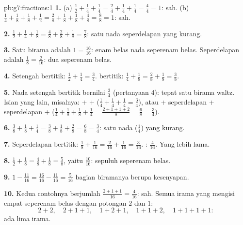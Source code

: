 \begin{solution}{pb:g7:fractions:1}
\textbf{1.} (a) $\frac12 + \frac14 + \frac14 = \frac24 + \frac14
+ \frac14 = \frac44 = 1$: sah. (b) $\frac14 + \frac18 +
\frac18 + \frac12 = \frac28 + \frac18 + \frac18 + \frac48 =
\frac88 = 1$: sah.

\textbf{2.} $\frac12 + \frac14 + \frac18 = \frac48 + \frac28 +
\frac18 = \frac78$: satu nada seperdelapan yang kurang.

\textbf{3.} Satu birama adalah $1 = \frac{16}{16}$: enam belas nada
seperenam belas. Seperdelapan adalah $\frac18 = \frac{2}{16}$: dua seperenam belas.

\textbf{4.} Setengah bertitik: $\frac12 + \frac14 = \frac34$.
 bertitik: $\frac14 + \frac18 = \frac28 + \frac18 = \frac38$.

\textbf{5.} Nada setengah bertitik bernilai $\frac34$ (pertanyaan 4):
tepat satu birama waltz. Isian yang lain, misalnya: 
$+$  $+$  ($\frac14 + \frac14 + \frac14 =
\frac34$), atau  $+$ seperdelapan $+$ seperdelapan $+$
 ($\frac14 + \frac18 + \frac18 + \frac14 = \frac{2 + 1 + 1 +
2}{8} = \frac68 = \frac34$).

\textbf{6.} $\frac38 + \frac18 + \frac14 = \frac38 + \frac18 +
\frac28 = \frac68 = \frac34$: satu nada  ($\frac14$) yang
kurang.

\textbf{7.} Seperdelapan bertitik: $\frac18 + \frac{1}{16} =
\frac{2}{16} + \frac{1}{16} = \frac{3}{16}$. :
$\frac{4}{16}$. Yang  lebih lama.

\textbf{8.} $\frac12 + \frac18 = \frac48 + \frac18 = \frac58$,
yaitu $\frac{10}{16}$: sepuluh seperenam belas.

\textbf{9.} $1 - \frac{11}{16} = \frac{16}{16} - \frac{11}{16}
= \frac{5}{16}$ bagian biramanya berupa kesenyapan.

\textbf{10.} Kedua contohnya berjumlah $\frac{2 + 1 + 1}{16} =
\frac{4}{16}$: sah. Semua irama yang mengisi empat seperenam belas
dengan potongan $2$ dan $1$:
\[
2{+}2, \quad 2{+}1{+}1, \quad 1{+}2{+}1, \quad 1{+}1{+}2, \quad
1{+}1{+}1{+}1 :
\]
ada lima irama.


\end{solution}
